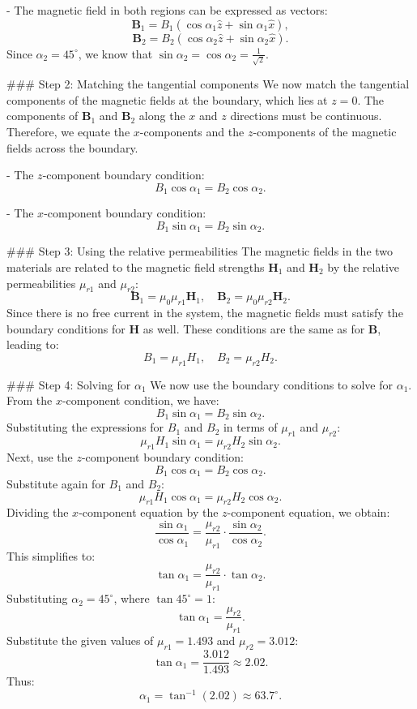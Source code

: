 \documentclass{article}
\begin{document}
- The magnetic field in both regions can be expressed as vectors:
  \[
  \mathbf{B}_1 = B_1 (\cos \alpha_1 \hat{z} + \sin \alpha_1 \hat{x}),
  \]
  \[
  \mathbf{B}_2 = B_2 (\cos \alpha_2 \hat{z} + \sin \alpha_2 \hat{x}).
  \]
  Since $\alpha_2 = 45^\circ$, we know that $\sin \alpha_2 = \cos \alpha_2 = \frac{1}{\sqrt{2}}$.

### Step 2: Matching the tangential components
We now match the tangential components of the magnetic fields at the boundary, which lies at $z = 0$. The components of $\mathbf{B}_1$ and $\mathbf{B}_2$ along the $x$ and $z$ directions must be continuous. Therefore, we equate the $x$-components and the $z$-components of the magnetic fields across the boundary.

- The $z$-component boundary condition:
  \[
  B_1 \cos \alpha_1 = B_2 \cos \alpha_2.
  \]

- The $x$-component boundary condition:
  \[
  B_1 \sin \alpha_1 = B_2 \sin \alpha_2.
  \]

### Step 3: Using the relative permeabilities
The magnetic fields in the two materials are related to the magnetic field strengths $\mathbf{H}_1$ and $\mathbf{H}_2$ by the relative permeabilities $\mu_{r1}$ and $\mu_{r2}$:
\[
\mathbf{B}_1 = \mu_0 \mu_{r1} \mathbf{H}_1, \quad \mathbf{B}_2 = \mu_0 \mu_{r2} \mathbf{H}_2.
\]
Since there is no free current in the system, the magnetic fields must satisfy the boundary conditions for $\mathbf{H}$ as well. These conditions are the same as for $\mathbf{B}$, leading to:
\[
B_1 = \mu_{r1} H_1, \quad B_2 = \mu_{r2} H_2.
\]

### Step 4: Solving for $\alpha_1$
We now use the boundary conditions to solve for $\alpha_1$. From the $x$-component condition, we have:
\[
B_1 \sin \alpha_1 = B_2 \sin \alpha_2.
\]
Substituting the expressions for $B_1$ and $B_2$ in terms of $\mu_{r1}$ and $\mu_{r2}$:
\[
\mu_{r1} H_1 \sin \alpha_1 = \mu_{r2} H_2 \sin \alpha_2.
\]
Next, use the $z$-component boundary condition:
\[
B_1 \cos \alpha_1 = B_2 \cos \alpha_2.
\]
Substitute again for $B_1$ and $B_2$:
\[
\mu_{r1} H_1 \cos \alpha_1 = \mu_{r2} H_2 \cos \alpha_2.
\]
Dividing the $x$-component equation by the $z$-component equation, we obtain:
\[
\frac{\sin \alpha_1}{\cos \alpha_1} = \frac{\mu_{r2}}{\mu_{r1}} \cdot \frac{\sin \alpha_2}{\cos \alpha_2}.
\]
This simplifies to:
\[
\tan \alpha_1 = \frac{\mu_{r2}}{\mu_{r1}} \cdot \tan \alpha_2.
\]
Substituting $\alpha_2 = 45^\circ$, where $\tan 45^\circ = 1$:
\[
\tan \alpha_1 = \frac{\mu_{r2}}{\mu_{r1}}.
\]
Substitute the given values of $\mu_{r1} = 1.493$ and $\mu_{r2} = 3.012$:
\[
\tan \alpha_1 = \frac{3.012}{1.493} \approx 2.02.
\]
Thus:
\[
\alpha_1 = \tan^{-1}(2.02) \approx 63.7^\circ.
\]
\end{document}
